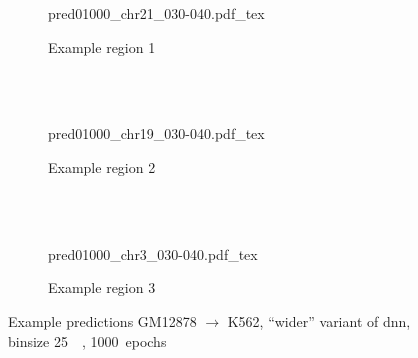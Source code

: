 \begin{figure}[p]
    \begin{subfigure}{\textwidth}
        \centering
        \scriptsize
        {pred01000_chr21_030-040.pdf_tex}
        \caption{Example  region 1} \label{fig:results:wider_r1}
    \end{subfigure}\\[2mm]
    \\[3mm]
    \begin{subfigure}{\textwidth}
        \centering
        \scriptsize
        {pred01000_chr19_030-040.pdf_tex}
        \caption{Example region 2} \label{fig:results:wider_r2}
    \end{subfigure}\\[2mm]
    \\[3mm]
    \begin{subfigure}{\textwidth}
        \centering
        \scriptsize
        {pred01000_chr3_030-040.pdf_tex}
        \caption{Example region 3} \label{fig:results:wider_r3}
    \end{subfigure}
    \caption{Example predictions GM12878 $\rightarrow$ K562, ``wider'' variant of \acrshort{dnn},\\binsize \SI{25}{\kilo\bp}, 1000~epochs}\label{fig:results:wider_matrices}
\end{figure}


